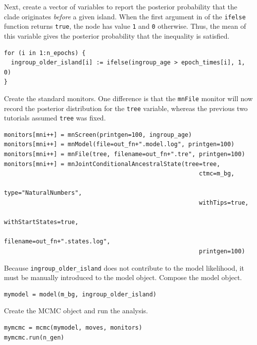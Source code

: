Next, create a vector of variables to report the posterior probability that the clade originates {\it before} a given island.
When the first argument in of the {\tt ifelse} function returns {\tt true}, the node has value {\tt 1} and {\tt 0} otherwise.
Thus, the mean of this variable gives the posterior probability that the inequality is satisfied.

\begin{snugshade}
\begin{lstlisting}
for (i in 1:n_epochs) {
  ingroup_older_island[i] := ifelse(ingroup_age > epoch_times[i], 1, 0)
}
\end{lstlisting}
\end{snugshade}

Create the standard monitors.
One difference is that the {\tt mnFile} monitor will now record the posterior distribution for the {\tt tree} variable, whereas the previous two tutorials assumed {\tt tree} was fixed.

\begin{snugshade}
\begin{lstlisting}
monitors[mni++] = mnScreen(printgen=100, ingroup_age)
monitors[mni++] = mnModel(file=out_fn+".model.log", printgen=100)
monitors[mni++] = mnFile(tree, filename=out_fn+".tre", printgen=100)
monitors[mni++] = mnJointConditionalAncestralState(tree=tree,
                                                       ctmc=m_bg,
                                                       type="NaturalNumbers",
                                                       withTips=true,
                                                       withStartStates=true,
                                                       filename=out_fn+".states.log",
                                                       printgen=100)
\end{lstlisting}
\end{snugshade}


Because {\tt ingroup\_older\_island} does not contribute to the model likelihood, it must be manually introduced to the model object.
Compose the model object.

\begin{snugshade}
\begin{lstlisting}
mymodel = model(m_bg, ingroup_older_island)
\end{lstlisting}
\end{snugshade}

Create the MCMC object and run the analysis.

\begin{snugshade}
\begin{lstlisting}
mymcmc = mcmc(mymodel, moves, monitors)
mymcmc.run(n_gen)
\end{lstlisting}
\end{snugshade}


